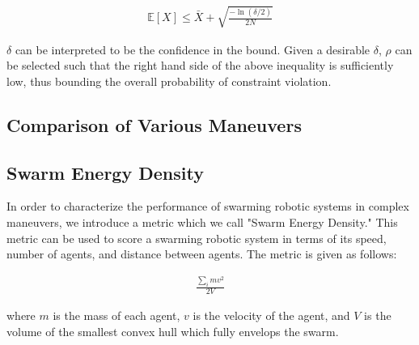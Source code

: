 \begin{align}
    \mathbb{E}[X] \leq \bar{X} + \sqrt{\frac{-\ln(\delta /2)}{2N}}
\end{align}

$\delta$ can be interpreted to be the confidence in the bound. Given a desirable $\delta$, $\rho$ can
be selected such that the right hand side of the above inequality is sufficiently low, thus bounding the 
overall probability of constraint violation.

\subsection{Comparison of Various Maneuvers}

\subsection{Swarm Energy Density}
In order to characterize the performance of swarming robotic systems in complex maneuvers, we introduce a metric
which we call "Swarm Energy Density."
This metric can be used to score a swarming robotic system in terms of its speed, number of agents, and distance
between agents. 
The metric is given as follows:

\begin{align}
    \frac{\sum_i mv^{2}}{2V}
\end{align}

where $m$ is the mass of each agent, $v$ is the velocity of the agent, and $V$ is the volume of the smallest 
convex hull which fully envelops the swarm.